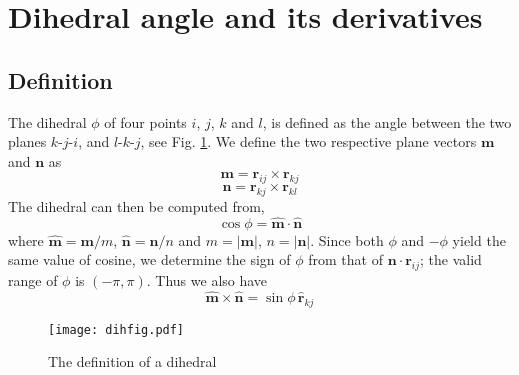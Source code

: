\documentclass{article}
\begin{document}
\newcommand{\vct}[1]{\mathbf{#1}}
\newcommand{\vx}{\vct{x}}
\newcommand{\vy}{\vct{y}}
\newcommand{\vz}{\vct{z}}
\newcommand{\vm}{\vct{m}}
\newcommand{\vn}{\vct{n}}
\newcommand{\vr}{\vct{r}}
\newcommand{\vxh}{\hat{\vct{x}}}
\newcommand{\vyh}{\hat{\vct{y}}}
\newcommand{\vzh}{\hat{\vct{z}}}
\newcommand{\vmh}{\hat{\vct{m}}}
\newcommand{\vnh}{\hat{\vct{n}}}
\newcommand{\vrh}{\hat{\vct{r}}}
\newcommand{\vmhh}{\hat{\hat{\vct{m}}}}
\newcommand{\vnhh}{\hat{\hat{\vct{n}}}}
\newcommand{\diphi}{\nabla_i \phi}
\newcommand{\djphi}{\nabla_j \phi}
\newcommand{\dkphi}{\nabla_k \phi}
\newcommand{\dlphi}{\nabla_l \phi}

\section{Dihedral angle and its derivatives}

\subsection{Definition}

The dihedral $\phi$ of four points $i$, $j$, $k$ and $l$,
is defined as the angle between the two planes
$k$-$j$-$i$, and $l$-$k$-$j$, see Fig. \ref{dihfig}.
%
We define the two respective plane vectors $\vm$ and $\vn$ as
\begin{equation}
\vm = \vr_{ij} \times \vr_{kj}
\label{eq:m}
\end{equation}
%
\begin{equation}
\vn = \vr_{kj} \times \vr_{kl}
\label{eq:n}
\end{equation}
%
The dihedral can then be computed from,
\begin{equation}
  \cos \phi = \vmh \cdot \vnh
  \label{eq:cosphi}
\end{equation}
%
where $\vmh = \vm/m$, $\vnh = \vn/n$
%
and $m = | \vm |$, $n = | \vn |$.
%
Since both $\phi$ and $-\phi$ yield the same value of cosine,
we determine the sign of $\phi$ from that of $\vn \cdot \vr_{ij}$;
the valid range of $\phi$ is $(-\pi, \pi)$.
Thus we also have
\begin{equation}
  \vmh \times \vnh  = \sin \phi \, \vrh_{kj}
  \label{eq:sinphi}
\end{equation}

%
\begin{figure}[h]
\begin{center}
\texttt{[image: dihfig.pdf]}
\caption{\label{dihfig}The definition of a dihedral}
\end{center}
\end{figure}
\end{document}
